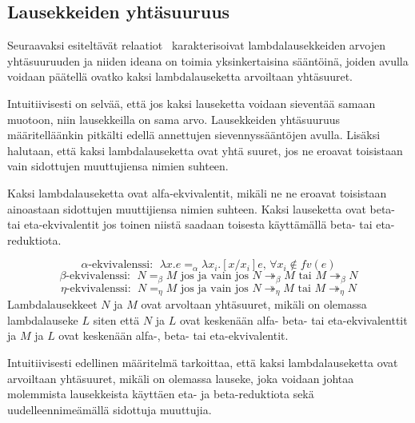 %

\subsection{Lausekkeiden yhtäsuuruus}

Seuraavaksi esiteltävät relaatiot~\cite[s.~23--24]{HBEB2000} karakterisoivat lambdalausekkeiden arvojen yhtäsuuruuden ja niiden ideana on toimia yksinkertaisina sääntöinä, joiden avulla voidaan päätellä ovatko kaksi lambdalauseketta arvoiltaan yhtäsuuret.
\par
Intuitiivisesti on selvää, että jos kaksi lauseketta voidaan sieventää samaan muotoon, niin lausekkeilla on sama arvo. Lausekkeiden yhtäsuuruus määritelläänkin pitkälti edellä annettujen sievennyssääntöjen avulla. Lisäksi halutaan, että kaksi lambdalauseketta ovat yhtä suuret, jos ne eroavat toisistaan vain sidottujen muuttujiensa nimien suhteen.  
\par
Kaksi lambdalauseketta ovat alfa-ekvivalentit, mikäli ne ne eroavat toisistaan ainoastaan sidottujen muuttijiensa nimien suhteen. Kaksi lauseketta ovat beta- tai eta-ekvivalentit jos toinen niistä saadaan toisesta käyttämällä beta- tai eta-reduktiota.

\begin{maar}
		 
\[ 
	\alpha \text{-ekvivalenssi: } \; \lambda x.e =_{\alpha} \lambda x_{i}.		[x/x_{i}]e \text{,  } \forall x_{i} \notin fv(e) 
\]
\[ 
	\beta \text{-ekvivalenssi: } \; N =_{\beta} M \text{ jos ja vain jos } N 		\twoheadrightarrow_{\beta} M \text{ tai }
	M \twoheadrightarrow_{\beta} N 
\]
\[ 
	\eta \text{-ekvivalenssi: } \; N =_{\eta} M \text{ jos ja vain jos } N 		\twoheadrightarrow_{\eta} M \text{ tai }
	M \twoheadrightarrow_{\eta} N 
\]
Lambdalausekkeet $N$ ja $M$ ovat arvoltaan yhtäsuuret, mikäli	on olemassa lambdalauseke $L$ siten että $N$ ja $L$ ovat keskenään alfa- beta- tai eta-ekvivalenttit ja $M$ ja $L$ ovat keskenään alfa-, beta- tai eta-ekvivalentit.	
\end{maar}

Intuitiivisesti edellinen määritelmä tarkoittaa, että kaksi lambdalauseketta ovat arvoiltaan yhtäsuuret, mikäli on olemassa lauseke, joka voidaan johtaa molemmista lausekkeista käyttäen eta- ja beta-reduktiota sekä uudelleennimeämällä sidottuja muuttujia. 

